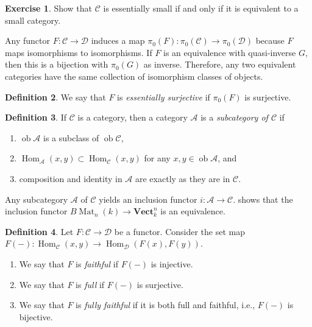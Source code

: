 \documentclass[10pt,letterpaper,cm]{nupset}
\theoremstyle{definition}
\newtheorem{definition}{Definition}[subsection]
\theoremstyle{theorem}
\newtheorem{exercise}[definition]{Exercise}
\theoremstyle{remark}
\newcommand{\1}{\mathbf{1}}
\renewcommand{\a}{\mathscr{A}}
\renewcommand{\c}{\mathscr{C}}
\renewcommand{\d}{\mathscr{D}}
\newcommand{\0}{\vec 0}
\DeclareMathOperator{\ob}{ob}
\DeclareMathOperator{\Mat}{Mat}
\DeclareMathOperator{\Hom}{Hom}
\begin{document}
\smallskip

\begin{exercise}
Show that $\c$ is essentially small  if and only if it is equivalent to a small category. 
\end{exercise}

\medskip

Any functor $F: \c \to \d$ induces a map $\pi_0(F) : \pi_0(\c) \to \pi_0(\d)$ because $F$ maps isomorphisms to isomorphisms. If $F$ is an equivalence with quasi-inverse $G$, then this is a bijection with $\pi_0(G)$ as inverse. Therefore, any two equivalent categories have the same collection of isomorphism classes of objects.


\begin{definition}
We say that $F$ is \textit{essentially surjective} if $\pi_0(F)$ is surjective. 
\end{definition}

\smallskip

\begin{definition}
If $\c$ is a category, then a category $\a$ is a \textit{subcategory of $\c$} if
\begin{enumerate}[label=(\roman*)]
\item $\ob{\a}$ is a subclass of $\ob{\c}$, 
\item $\Hom_{\a}(x,y) \subset \Hom_{\c}(x,y)$ for any $x,y\in \ob{\a}$, and
\item composition and identity in $\a$ are exactly as they are in $\c$.
\end{enumerate}
\end{definition}

\smallskip

Any subcategory $\a$ of $\c$ yields an inclusion functor $i : \a \to \c$.   shows that the inclusion functor $B{\Mat_n(k)} \to \mathbf{Vect}_k^n$ is an equivalence. 

\medskip

\begin{definition} Let $F: \c \to \d$ be a functor. Consider the set map $F({-}): \Hom_{\c}(x,y) \to \Hom_{\d}(F(x), F(y))$.
\begin{enumerate}
\item We say that $F$ is \textit{faithful} if $F({-})$ is injective.
\item We say that $F$ is \textit{full} if $F({-})$ is surjective. 
\item We say that $F$ is \textit{fully faithful} if it is both full and faithful, i.e., $F({-})$ is bijective.
\end{enumerate}
\end{definition}
\end{document}
